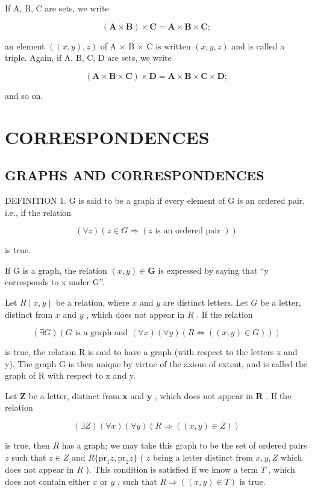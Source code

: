 If A, B, C are sets, we write

\[
(\mathbf {A} \times \mathbf {B}) \times \mathbf {C} = \mathbf {A} \times \mathbf {B} \times \mathbf {C};
\]

an element \(((x, y), z)\) of A × B × C is written \((x, y, z)\) and is called a triple. Again, if A, B, C, D are sets, we write

\[
(\mathbf {A} \times \mathbf {B} \times \mathbf {C}) \times \mathbf {D} = \mathbf {A} \times \mathbf {B} \times \mathbf {C} \times \mathbf {D};
\]

and so on.

\section{CORRESPONDENCES}

\subsection{GRAPHS AND CORRESPONDENCES}

DEFINITION 1. G is said to be a graph if every element of G is an ordered pair, i.e., if the relation

\[
(\forall z) (z \in G \Longrightarrow (z \text {   is   an   ordered   pair }))
\]

is true.

If G is a graph, the relation \((x, y) \in \mathbf{G}\) is expressed by saying that ``y corresponds to x under G''.

Let \(R \mid x, y \mid\) be a relation, where \(x\) and \(y\) are distinct letters. Let \(G\) be a letter, distinct from \(x\) and \(y\) , which does not appear in \(R\) . If the relation

\[
(\exists G) (G \text {   is   a   graph   and   } (\forall x) (\forall y) (R \Longleftrightarrow ((x, y) \in G)))
\]

is true, the relation R is said to have a graph (with respect to the letters x and y). The graph G is then unique by virtue of the axiom of extent, and is called the graph of R with respect to x and y.

Let \(\pmb{Z}\) be a letter, distinct from \(\pmb{x}\) and \(\pmb{y}\) , which does not appear in \(\pmb{R}\) . If the relation

\[
(\exists Z) (\forall x) (\forall y) (R \Longrightarrow ((x, y) \in Z))
\]

is true, then \(R\) has a graph; we may take this graph to be the set of ordered pairs \(z\) such that \(z \in Z\) and \(R \{ \text{pr}_1 z, \text{pr}_2 z \}\) ( \(z\) being a letter distinct from \(x, y, Z\) which does not appear in \(R\) ). This condition is satisfied if we know a term \(T\) , which does not contain either \(x\) or \(y\) , such that \(R \Longrightarrow ((x, y) \in T)\) is true.

